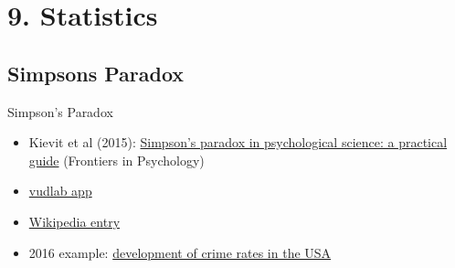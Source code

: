 \documentclass[xcolor=table,           xcolor=dvipsnames]{beamer}\usepackage[]{graphicx}\usepackage[]{color}
\begin{document}
\section{9. Statistics}

\subsection{Simpsons Paradox}

\begin{frame}{Simpson's Paradox}
\begin{itemize}
\item Kievit et al (2015): \href{http://journal.frontiersin.org/article/10.3389/fpsyg.2013.00513/full}{Simpson's paradox in psychological science: a practical guide} (Frontiers in Psychology)
\item \href{http://vudlab.com/simpsons/}{vudlab app}
\item \href{https://en.wikipedia.org/wiki/Simpson\%27s\_paradox\#Examples}{Wikipedia entry}
\item 2016 example: \href{http://www.nytimes.com/2016/09/28/us/murder-rate-cities.html}{development of crime rates in the USA}
\end{itemize}
\label{simpson}
\end{frame}

\end{document}
